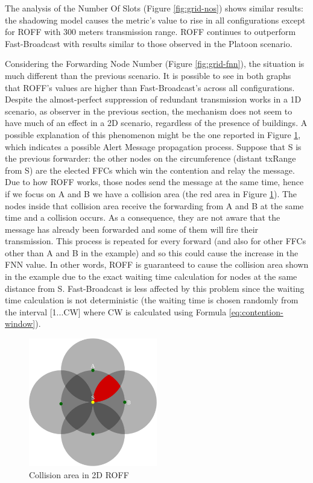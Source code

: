 		
		The analysis of the Number Of Slots (Figure \ref{fig:grid-nos}) shows similar results: the shadowing model causes the metric's value to rise in all configurations except for ROFF with 300 meters transmission range. ROFF continues to outperform Fast-Broadcast with results similar to those observed in the Platoon scenario. 
		
		
		Considering the Forwarding Node Number (Figure \ref{fig:grid-fnn}), the situation is much different than the previous scenario. It is possible to see in both graphs that ROFF's values are higher than Fast-Broadcast's across all configurations. Despite the almost-perfect suppression of redundant transmission works in a 1D scenario, as observer in the previous section, the mechanism does not seem to have much of an effect in a 2D scenario, regardless of the presence of buildings. A possible explanation of this phenomenon might be the one reported in Figure \ref{fig:2d-roff}, which indicates a possible Alert Message propagation process. Suppose that S is the previous forwarder: the other nodes on the circumference (distant txRange from S) are the elected FFCs which win the contention and relay the message. Due to how ROFF works, those nodes send the message at the same time, hence if we focus on A and B we have a collision area (the red area in Figure \ref{fig:2d-roff}). The nodes inside that collision area receive the forwarding from A and B at the same time and a collision occurs. As a consequence, they are not aware that the message has already been forwarded and some of them will fire their transmission. This process is repeated for every forward (and also for other FFCs other than A and B in the example) and so this could cause the increase in the FNN value. In other words, ROFF is guaranteed to cause the collision area shown in the example due to the exact waiting time calculation for nodes at the same distance from S. Fast-Broadcast is less affected by this problem since the waiting time calculation is not deterministic (the waiting time is chosen randomly from the interval [1...CW] where CW is calculated using Formula \ref{eq:contention-window}).
	
		\begin{figure}[H]
			\centering
			\includegraphics[width=0.5\textwidth]{immagini/2d-roff}
			\caption{Collision area in 2D ROFF}
			\label{fig:2d-roff}
		\end{figure}

